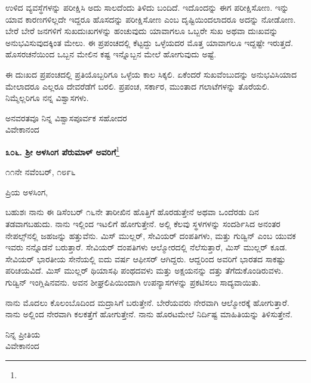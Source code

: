 \vspace{0.15cm}

ಉಳಿದ ವ್ಯವಸ್ಥೆಗಳನ್ನು ಪರೀಕ್ಷಿಸಿ ಅದು ಸಾಲದೆಂದು ತಿಳಿದು ಬಂದಿದೆ. ಇದೊಂದನ್ನು ಈಗ ಪರೀಕ್ಷಿಸೋಣ. ಇನ್ನು ಯಾವ ಕಾರಣಗಳಿಲ್ಲದೇ ಇದ್ದರೂ ಹೊಸದನ್ನು ಪರೀಕ್ಷಿಸೋಣ ಎಂಬ ದೃಷ್ಟಿಯಿಂದಲಾದರೂ ಅದನ್ನು ನೋಡೋಣ. ಬೇರೆ ಬೇರೆ ಜನಗಳಿಗೆ ಸುಖದುಃಖಗಳನ್ನು ಹಂಚುವುದು ಯಾವಾಗಲೂ ಒಬ್ಬರೇ ಸುಖ ಅಥವಾ ದುಃಖವನ್ನು ಅನುಭವಿಸುವುದಕ್ಕಿಂತ ಮೇಲು. ಈ ಪ್ರಪಂಚದಲ್ಲಿ ಕೆಟ್ಟದ್ದು ಒಳ್ಳೆಯದರ ಮೊತ್ತ ಯಾವಾಗಲೂ ಇದ್ದಷ್ಟೇ ಇರುತ್ತದೆ. ಹೊಸರಚನೆಯಿಂದ ಒಬ್ಬನ ಮೇಲಿನ ಕಷ್ಟ ಇನ್ನೊಬ್ಬನ ಮೇಲೆ ಹೋಗುವುದು ಅಷ್ಟೆ.

\vspace{0.15cm}

ಈ ದುಃಖದ ಪ್ರಪಂಚದಲ್ಲಿ ಪ್ರತಿಯೊಬ್ಬರಿಗೂ ಒಳ್ಳೆಯ ಕಾಲ ಸಿಕ್ಕಲಿ. ಏಕೆಂದರೆ ಸುಖವೆಂಬುದನ್ನು ಅನುಭವಿಸಿಯಾದ ಮೇಲಾದರೂ ಎಲ್ಲರೂ ದೇವರೆಡೆಗೆ ಬರಲಿ. ಪ್ರಪಂಚ, ಸರ್ಕಾರ, ಮುಂತಾದ ಗಲಾಟೆಗಳನ್ನು ತೊರೆಯಲಿ. ನಿಮ್ಮೆಲ್ಲರಿಗೂ ನನ್ನ ವಿಶ್ವಾಸಗಳು.

\vspace{0.15cm}

{\flushright
ಅನವರತವೂ ನಿನ್ನ ವಿಶ್ವಾಸಪೂರ್ವಕ ಸಹೋದರ\\ವಿವೇಕಾನಂದ\par}

\newpage

\begin{center}
\textbf{೩೦೬. ಶ‍್ರೀ ಅಳಸಿಂಗ ಪೆರುಮಾಳ್ ಅವರಿಗೆ}\footnote{}
\end{center}

\begin{flushright}
೧೧ನೇ ನವೆಂಬರ್, ೧೮೯೬
\end{flushright}

\noindent
ಪ್ರಿಯ ಅಳಸಿಂಗ,

ಬಹುಶಃ ನಾನು ಈ ಡಿಸೆಂಬರ್ ೧೬ನೇ ತಾರೀಖಿನ ಹೊತ್ತಿಗೆ ಹೊರಡುತ್ತೇನೆ ಅಥವಾ ಒಂದೆರಡು ದಿನ ತಡವಾಗಬಹುದು. ನಾನು ಇಲ್ಲಿಂದ ಇಟಲಿಗೆ ಹೋಗುತ್ತೇನೆ. ಅಲ್ಲಿ ಕೆಲವು ಸ್ಥಳಗಳನ್ನು ಸಂದರ್ಶಿಸಿದ ಅನಂತರ ನೇಪಲ್ಸ್‌ನಲ್ಲಿ ಜಹಜನ್ನು ಹತ್ತುವೆನು. ಮಿಸ್ ಮುಲ್ಲರ್, ಸೇವಿಯರ್ ದಂಪತಿಗಳು, ಮತ್ತು ಗುಡ್ವಿನ್ ಎಂಬ ಯುವಕ ಇವರು ನನ್ನೊಡನೆ ಬರುತ್ತಾರೆ. ಸೇವಿಯರ್ ದಂಪತಿಗಳು ಆಲ್ಮೋರದಲ್ಲಿ ನೆಲೆಸುತ್ತಾರೆ, ಮಿಸ್ ಮುಲ್ಲರ್ ಕೂಡ. ಸೇವಿಯರ್ ಭಾರತೀಯ ಸೇನೆಯಲ್ಲಿ ಐದು ವರ್ಷ ಆಫೀಸರ್ ಆಗಿದ್ದರು. ಆದ್ದರಿಂದ ಅವರಿಗೆ ಭಾರತದ ಸಾಕಷ್ಟು ಪರಿಚಯವಿದೆ. ಮಿಸ್ ಮುಲ್ಲರ್ ಥಿಯಾಸಫಿ ಪಂಥದವಳು ಮತ್ತು ಅಕ್ಷಯನನ್ನು ದತ್ತು ತೆಗೆದುಕೊಂಡಿರುವಳು. ಗುಡ್ವಿನ್ ಇಂಗ್ಲಿಷಿನವನು. ಅವನ ಶೀಘ್ರಲಿಪಿಯಿಂದಾಗಿ ಉಪನ್ಯಾಸಗಳನ್ನು ಪ್ರಕಟಿಸಲು ಸಾದ್ಯವಾಯಿತು.

ನಾನು ಮೊದಲು ಕೊಲಂಬೊದಿಂದ ಮದ್ರಾಸಿಗೆ ಬರುತ್ತೇನೆ. ಬೇರೆಯವರು ನೇರವಾಗಿ ಆಲ್ಮೋರಕ್ಕೆ ಹೋಗುತ್ತಾರೆ. ನಾನು ಅಲ್ಲಿಂದ ನೇರವಾಗಿ ಕಲಕತ್ತೆಗೆ ಹೋಗುತ್ತೇನೆ. ನಾನು ಹೊರಟಮೇಲೆ ನಿರ್ದಿಷ್ಟ ಮಾಹಿತಿಯನ್ನು ತಿಳಿಸುತ್ತೇನೆ.

\begin{flushright}
ನಿನ್ನ ಪ್ರೀತಿಯ\\ವಿವೇಕಾನಂದ
\end{flushright}

